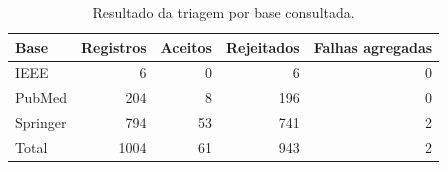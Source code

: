 \begin{table}[!htb]
\centering
\caption{Resultado da triagem por base consultada.}
\label{tab:revisao_sistematica_triagem}
\small
\begin{tabular}{lrrrr}
\toprule
Base & Registros & Aceitos & Rejeitados & Falhas agregadas \\
\midrule
IEEE & 6 & 0 & 6 & 0 \\
PubMed & 204 & 8 & 196 & 0 \\
Springer & 794 & 53 & 741 & 2 \\
Total & 1004 & 61 & 943 & 2 \\
\bottomrule
\end{tabular}
\normalsize
\end{table}
